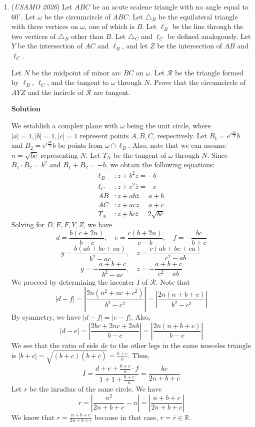 \begin{enumerate}
	\item (\textit{USAMO 2026}) Let $ABC$ be an acute scalene triangle with no angle equal to $60^\circ$. Let $\omega$ be the circumcircle of $ABC$. Let $\triangle_B$ be the equilateral triangle with three vertices on $\omega$, one of which is $B$. Let $\ell_B$ be the line through the two vertices of $\triangle_B$ other than $B$. Let $\triangle_C$ and $\ell_C$ be defined analogously. Let $Y$ be the intersection of $AC$ and $\ell_B$, and let $Z$ be the intersection of $AB$ and $\ell_C$.


 Let $N$ be the midpoint of minor arc $BC$ on $\omega$. Let $\mathcal{R}$ be the triangle formed by $\ell_B$, $\ell_C$, and the tangent to $\omega$ through $N$. Prove that the circumcircle of $AYZ$ and the incircle of $\mathcal{R}$ are tangent.


 



\textbf{Solution}

We establish a complex plane with $\omega$ being the unit circle, where $\lvert a\rvert=1,\lvert b\rvert=1,\lvert c\rvert=1$ represent points $A,B,C$, respectively. Let $B_1=e^{i\frac{2\pi}{3}}b$ and $B_2=e^{i\frac{4\pi}{3}}b$ be points from $\omega\cap\ell_B$. Also, note that we can assume $n=\sqrt{bc}$ representing $N$. Let $T_N$ be the tangent of $\omega$ through $N$. Since $B_1\cdot B_2=b^2$ and $B_1+B_2=-b$, we obtain the following equations:\begin{align*}\ell_B&: z+b^2 \overline{z}=-b\\\ell_C&: z+c^2 \overline{z}=-c\\AB&: z+ab\overline{z}=a+b\\AC&: z+ac\overline{z}=a+c\\T_N&: z+bc\overline{z}=2\sqrt{bc}\end{align*}
Solving for $D,E,F,Y,Z$, we have
 \[d=\frac{b(c+2n)}{b-c},\quad e=\frac{c(b+2n)}{c-b},\quad f=-\frac{bc}{b+c}\]
 \[y=\frac{b(ab+bc+ca)}{b^2-ac},\quad z=\frac{c(ab+bc+ca)}{c^2-ab}\]
 \[\overline{y}=-\frac{a+b+c}{b^2-ac},\quad\overline{z}=-\frac{a+b+c}{c^2-ab}\]We proceed by determining the incenter $I$ of $\mathcal{R}$. Note that
 \[\lvert d-f\rvert=\left\lvert \frac{2n(n^2+nc+c^2)}{b^2-c^2}\right\rvert =\left\lvert \frac{2n(n+b+c)}{b^2-c^2}\right\rvert\]By symmetry, we have $\lvert d-f\rvert=\lvert e-f\rvert$. Also, 
 \[\lvert d-e\rvert=\left\lvert \frac{2bc+2nc+2nb}{b-c}\right\rvert=\left\lvert \frac{2n(n+b+c)}{b-c}\right\rvert\]We see that the ratio of side $de$ to the other legs in the same isosceles triangle is $\lvert b+c\rvert=\sqrt{(b+c)\left(\overline{b}+\overline{c}\right)}=\frac{b+c}{n}$. Thus,
 \[I=\frac{d+e+\frac{b+c}{n}\cdot f}{1+1+\frac{b+c}{n}}=\frac{bc}{2n+b+c}\]Let $r$ be the inradius of the same circle. We have
 \[r=\left\lvert\frac{n^2}{2n+b+c}-n\right\rvert=\left\lvert\frac{n+b+c}{2n+b+c}\right\rvert\]We know that $r=\frac{n+b+c}{2n+b+c}$ because in that case, $r=\overline{r}\in\mathbb{R}$.


\end{enumerate}
